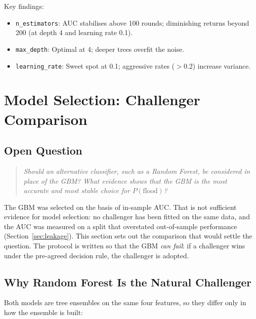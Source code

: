 \documentclass[11pt,a4paper]{article}
\begin{document}
Key findings:
\begin{itemize}[nosep]
    \item \texttt{n\_estimators}: AUC stabilises above 100 rounds; diminishing
          returns beyond 200 (at depth 4 and learning rate 0.1).
    \item \texttt{max\_depth}: Optimal at 4; deeper trees overfit the noise.
    \item \texttt{learning\_rate}: Sweet spot at 0.1; aggressive rates ($>$0.2)
          increase variance.
\end{itemize}



\section{Model Selection: Challenger Comparison}
\label{sec:challenger}

\subsection{Open Question}

\begin{quote}
\emph{Should an alternative classifier, such as a Random Forest, be
considered in place of the GBM?  What evidence shows that the GBM is
the most accurate and most stable choice for $P(\text{flood})$?}
\end{quote}

\noindent The GBM was selected on the basis of in-sample AUC.  That is
not sufficient evidence for model selection: no challenger has been
fitted on the same data, and the AUC was measured on a split that
overstated out-of-sample performance (Section~\ref{sec:leakage}).  This
section sets out the comparison that would settle the question.  The
protocol is written so that the GBM \emph{can fail}: if a challenger
wins under the pre-agreed decision rule, the challenger is adopted.

\subsection{Why Random Forest Is the Natural Challenger}

Both models are tree ensembles on the same four features, so they
differ only in how the ensemble is built:
\end{document}
